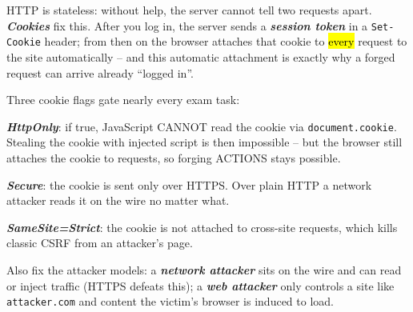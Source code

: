 \documentclass[12pt, a4paper]{article}
\newcommand{\term}[1]{\textbf{\textit{#1}}}        %
\newcommand{\imp}[1]{\hl{#1}}                       %
\begin{document}
HTTP is stateless: without help, the server cannot tell two requests apart. \term{Cookies} fix this. After you log in, the server sends a \term{session token} in a \texttt{Set-Cookie} header; from then on the browser attaches that cookie to \imp{every} request to the site automatically -- and this automatic attachment is exactly why a forged request can arrive already ``logged in''.

Three cookie flags gate nearly every exam task:
\begin{tightitem}
    \item \term{HttpOnly}: if true, JavaScript CANNOT read the cookie via \texttt{document.cookie}. Stealing the cookie with injected script is then impossible -- but the browser still attaches the cookie to requests, so forging ACTIONS stays possible.
    \item \term{Secure}: the cookie is sent only over HTTPS. Over plain HTTP a network attacker reads it on the wire no matter what.
    \item \term{SameSite=Strict}: the cookie is not attached to cross-site requests, which kills classic CSRF from an attacker's page.
\end{tightitem}
Also fix the attacker models: a \term{network attacker} sits on the wire and can read or inject traffic (HTTPS defeats this); a \term{web attacker} only controls a site like \texttt{attacker.com} and content the victim's browser is induced to load.
\end{document}
